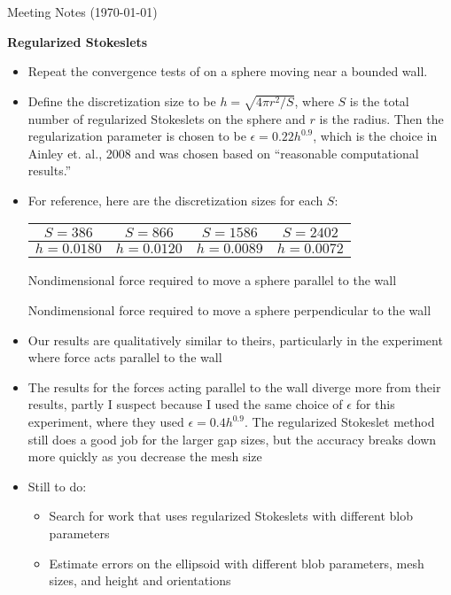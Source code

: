\documentclass{article}
\begin{document}
\pagestyle{plain}

\begin{center}
  {\Large Meeting Notes (\today)}
\end{center}

\large{\textbf{Regularized Stokeslets}}

\begin{itemize}
\item Repeat the convergence tests of \cite{Ainley2008} on a sphere
  moving near a bounded wall. 
\item Define the discretization size to be $h = \sqrt{4\pi r^2 / S}$,
  where $S$ is the total number of regularized Stokeslets on the
  sphere and $r$ is the radius. Then the regularization parameter is
  chosen to be $\epsilon = 0.22 h^{0.9}$, which is the choice in
  Ainley et. al., 2008 \cite{Ainley2008} and was chosen based on
  ``reasonable computational results.''
\item For reference, here are the discretization sizes for each $S$:

  \begin{tabular}{cccc}
    $S = 386$ & $S = 866$ & $S = 1586$ & $S = 2402$ \\ \midrule
    $h = 0.0180$ & $h = 0.0120$ & $h = 0.0089$ & $h = 0.0072$
  \end{tabular}
  
  \begin{table}[h]
    \centering
    \caption{Nondimensional force required to move a sphere parallel
      to the wall}
    \label{tab:par-table}
  \end{table}

  \begin{table}[h]
    \centering
    \caption{Nondimensional force required to move a sphere
      perpendicular to the wall}
    \label{tab:prp-table}
  \end{table}
\item Our results are qualitatively similar to theirs, particularly in
  the experiment where force acts parallel to the wall
\item The results for the forces acting parallel to the wall diverge
  more from their results, partly I suspect because I used the same
  choice of $\epsilon$ for this experiment, where they used $\epsilon
  = 0.4 h^{0.9}$. The regularized Stokeslet method still does a good
  job for the larger gap sizes, but the accuracy breaks down more
  quickly as you decrease the mesh size
\item Still to do:
  \begin{itemize}
  \item Search for work that uses regularized Stokeslets with
    different blob parameters
  \item Estimate errors on the ellipsoid with different blob
    parameters, mesh sizes, and height and orientations
  \end{itemize}
\end{itemize}
\end{document}
